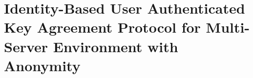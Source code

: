 \chapter{Identity-Based User Authenticated Key Agreement Protocol for Multi-Server Environment with Anonymity}
\label{Ch4}

